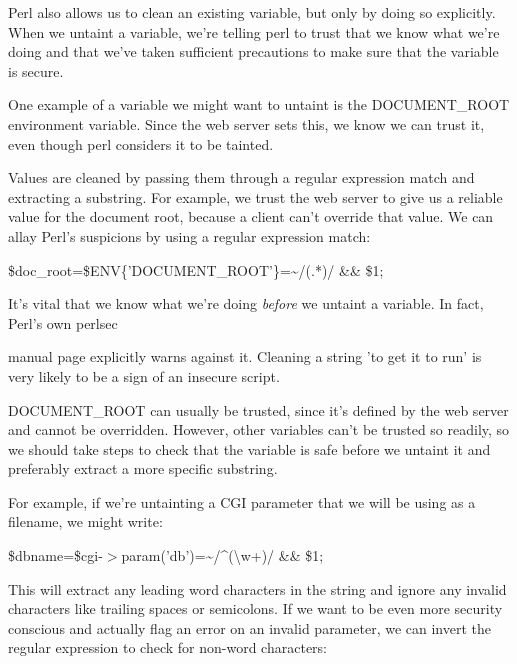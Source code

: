 \documentclass[a4paper,11pt]{book}
\begin{document}
\noindent 

\noindent Perl also allows us to clean an existing variable, but only by doing so explicitly. When we untaint a variable, we're telling perl to trust that we know what we're doing and that we've taken sufficient precautions to make sure that the variable is secure.

\noindent 

\noindent One example of a variable we might want to untaint is the DOCUMENT\_ROOT environment variable. Since the web server sets this, we know we can trust it, even though perl considers it to be tainted.

\noindent 

\noindent Values are cleaned by passing them through a regular expression match and extracting a substring. For example, we trust the web server to give us a reliable value for the document root, because a client can't override that value. We can allay Perl's suspicions by using a regular expression match:

\noindent 

\noindent \$doc\_root=\$ENV\{'DOCUMENT\_ROOT'\}=\~{}/(.*)/ \&\& \$1;

\noindent 

\noindent It's vital  that we know what we're doing \textit{before }we untaint a variable. In fact, Perl's own perlsec

\noindent manual page explicitly warns against it. Cleaning a string 'to get it to run' is very likely to be a sign of an insecure script.

\noindent 

\noindent DOCUMENT\_ROOT can usually be trusted, since it's defined by the web server and cannot be overridden. However, other variables can't be trusted so readily, so we should take steps to check that the variable is safe before we untaint it and preferably extract a more specific substring.

\noindent 

\noindent For example, if we're untainting a CGI parameter that we will be using as a filename, we might write:

\noindent 

\noindent 

\noindent \$dbname=\$cgi-$>$param('db')=\~{}/\^{}(\textbackslash w+)/ \&\& \$1;

\noindent 

\noindent This will extract any leading word characters in the string and ignore any invalid characters like trailing spaces or semicolons. If we want to be even more security conscious and actually flag an error on an invalid parameter, we can invert the regular expression to check for non-word characters:
\end{document}
